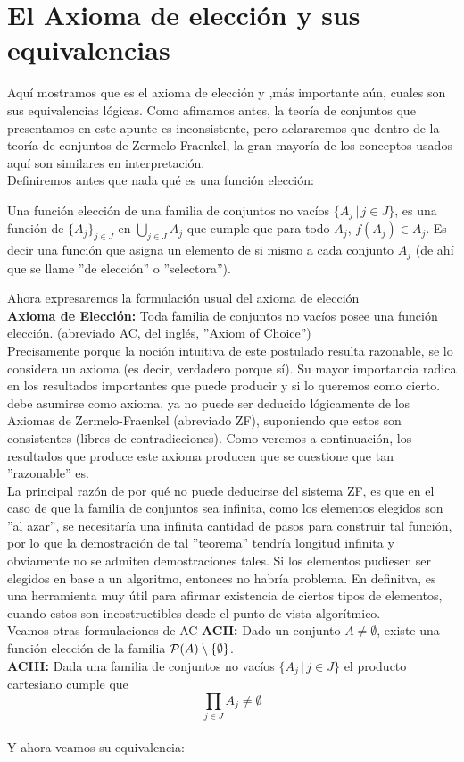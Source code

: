 \documentclass[12pt,a4paper]{book}
\begin{document}
\else
\fi

\section{El Axioma de elección y sus equivalencias}

Aquí mostramos que es el axioma de elección y ,más importante aún, cuales son sus equivalencias lógicas. Como afimamos antes, la teoría de conjuntos que presentamos en este apunte es inconsistente, pero aclararemos que dentro de la teoría de conjuntos de Zermelo-Fraenkel, la gran mayoría de los conceptos usados aquí son similares en interpretación.\\
Definiremos antes que nada qué es una función elección:

\begin{defi} %
Una función elección de una familia de conjuntos no vacíos $\{A_j \,\vert\, j \in J\}$, es una función de $\{A_j\}_{j \in J}$ en $ \bigcup_{j \in J} A_j $ que cumple que para todo $A_j$, $f(A_j) \in A_j$. Es decir una función que asigna un elemento de si mismo a cada conjunto $A_j$ (de ahí que se llame ''de elección'' o ''selectora'').
\end{defi}

Ahora expresaremos la formulación usual del axioma de elección\\[0.5cm]
\textbf{Axioma de Elección:} Toda familia de conjuntos no vacíos posee una función elección. (abreviado AC, del inglés, ''Axiom of Choice'') \\[0.5cm]
Precisamente porque la noción intuitiva de este postulado resulta razonable, se lo considera un axioma (es decir, verdadero porque sí). Su mayor importancia radica en los resultados importantes que puede producir y si lo queremos como cierto. debe asumirse como axioma, ya no puede ser deducido lógicamente de los Axiomas de Zermelo-Fraenkel (abreviado ZF), suponiendo que estos son consistentes (libres de contradicciones). Como veremos a continuación, los resultados que produce este axioma producen que se cuestione que tan ''razonable'' es.\\
La principal razón de por qué no puede deducirse del sistema ZF, es que en el caso de que la familia de conjuntos sea infinita, como los elementos elegidos son ''al azar'', se necesitaría una infinita cantidad de pasos para construir tal función, por lo que la demostración de tal ''teorema'' tendría longitud infinita y obviamente no se admiten demostraciones tales. Si los elementos pudiesen ser elegidos en base a un algoritmo, entonces no habría problema. En definitva, es una herramienta muy útil para afirmar existencia de ciertos tipos de elementos, cuando estos son incostructibles desde el punto de vista algorítmico.\\[0.5cm]
Veamos otras formulaciones de AC\newpage
\textbf{ACII:} Dado un conjunto $A \neq \emptyset$, existe una función elección de la familia $\P(A) \setminus \{\emptyset\}$.\\[0.5cm]
\textbf{ACIII:} Dada una familia de conjuntos no vacíos $\{A_j \,\vert\, j \in J\}$ el producto cartesiano cumple que
$$ \prod_{j \in J} A_j \neq \emptyset$$\\
Y ahora veamos su equivalencia:
\end{document}
